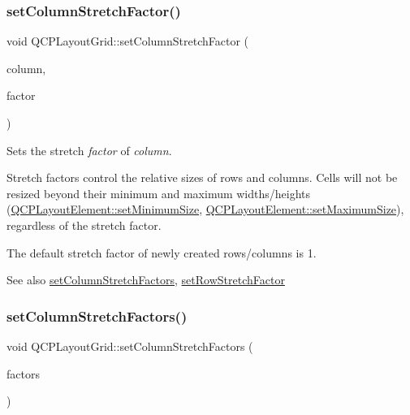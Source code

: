 \subsubsection{\texorpdfstring{set\+Column\+Stretch\+Factor()}{setColumnStretchFactor()}}
{\footnotesize\ttfamily void Q\+C\+P\+Layout\+Grid\+::set\+Column\+Stretch\+Factor (\begin{DoxyParamCaption}\item[{int}]{column,  }\item[{double}]{factor }\end{DoxyParamCaption})}

Sets the stretch {\itshape factor} of {\itshape column}.

Stretch factors control the relative sizes of rows and columns. Cells will not be resized beyond their minimum and maximum widths/heights (\hyperlink{class_q_c_p_layout_element_a5dd29a3c8bc88440c97c06b67be7886b}{Q\+C\+P\+Layout\+Element\+::set\+Minimum\+Size}, \hyperlink{class_q_c_p_layout_element_a74eb5280a737ab44833d506db65efd95}{Q\+C\+P\+Layout\+Element\+::set\+Maximum\+Size}), regardless of the stretch factor.

The default stretch factor of newly created rows/columns is 1.

\begin{DoxySeeAlso}{See also}
\hyperlink{class_q_c_p_layout_grid_a6c2591d1a7e2534ce036989543b49e57}{set\+Column\+Stretch\+Factors}, \hyperlink{class_q_c_p_layout_grid_a7b0273de5369bd93d942edbaf5b166ec}{set\+Row\+Stretch\+Factor} 
\end{DoxySeeAlso}
\mbox{\label{class_q_c_p_layout_grid_a6c2591d1a7e2534ce036989543b49e57}} 
\subsubsection{\texorpdfstring{set\+Column\+Stretch\+Factors()}{setColumnStretchFactors()}}
{\footnotesize\ttfamily void Q\+C\+P\+Layout\+Grid\+::set\+Column\+Stretch\+Factors (\begin{DoxyParamCaption}\item[{const \hyperlink{class_q_list}{Q\+List}$<$ double $>$ \&}]{factors }\end{DoxyParamCaption})}

